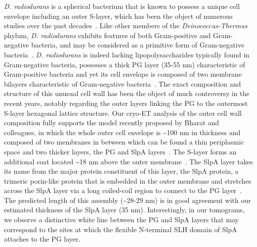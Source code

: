 \textit{D. radiodurans} is a spherical bacterium that is known to possess a unique cell envelope including an outer S-layer, which has been the object of numerous studies over the past decades~\cite{vonkugelgenMultidomainConnectorLinks2022,workMorphologyChemistryCell1968,rothfussInvolvementSlayerProteins2006,vonkugelgenInterdigitatedImmunoglobulinArrays2023,farciSDBCActiveQuenching2023,farciStructuredOrganizationDeinococcus2022,farciCryoEMStructureSlayer2022,farciStructuralAnalysisArchitecture2021,baumeisterThreedimensionalStructureRegular1986,baumeisterStructureCellEnvelope1981}.
Like other members of the \textit{Deinococcus-Thermus} phylum, \textit{D. radiodurans} exhibits features of both Gram-positive and Gram-negative bacteria, and may be considered as a primitive form of Gram-negative bacteria~\cite{ericksonHowBacterialCell2017}.
\textit{D. radiodurans} is indeed lacking lipopolysaccharides typically found in Gram-negative bacteria, possesses a thick PG layer (35-55 nm) characteristic of Gram-positive bacteria and yet its cell envelope is composed of two membrane bilayers characteristic of Gram-negative bacteria~\cite{guptaOriginDidermGramnegative2011}.
The exact composition and structure of this unusual cell wall has been the object of much controversy in the recent years, notably regarding the outer layers linking the PG to the outermost S-layer hexagonal lattice structure.
Our cryo-ET analysis of the outer cell wall composition fully supports the model recently proposed by Bharat and colleagues, in which the whole outer cell envelope is \sim100 nm in thickness and composed of two membranes in between which can be found a thin periplasmic space and two thicker layers, the PG and SlpA layers~\cite{vonkugelgenMultidomainConnectorLinks2022}.
The S-layer forms an additional coat located \sim18 nm above the outer membrane~\cite{vonkugelgenInterdigitatedImmunoglobulinArrays2023}.
The SlpA layer takes its name from the major protein constituent of this layer, the SlpA protein, a trimeric porin-like protein that is embedded in the outer membrane and stretches across the SlpA layer via a long coiled-coil region to connect to the PG layer~\cite{vonkugelgenMultidomainConnectorLinks2022}.
The predicted length of this assembly (\sim28-29 nm) is in good agreement with our estimated thickness of the SlpA layer (35 nm).
Interestingly, in our tomograms, we observe a distinctive white line between the PG and SlpA layers that may correspond to the sites at which the flexible N-terminal SLH domain of SlpA attaches to the PG layer.

